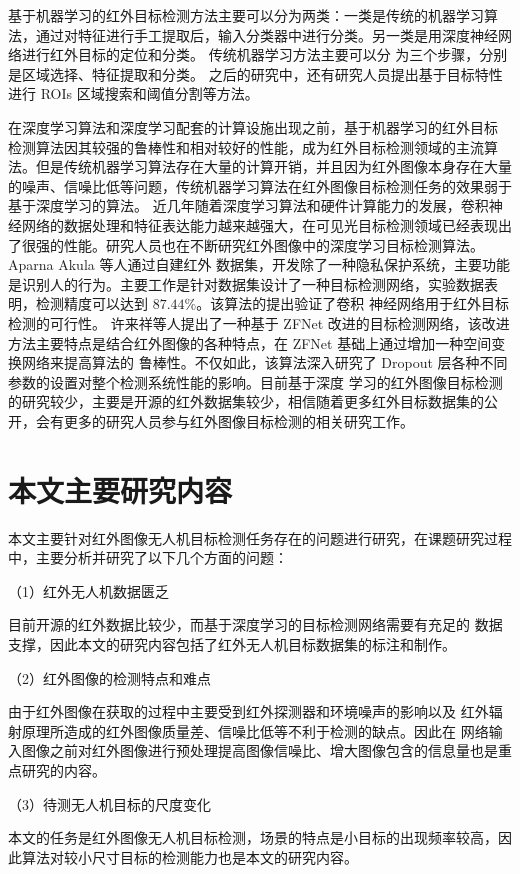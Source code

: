 基于机器学习的红外目标检测方法主要可以分为两类：一类是传统的机器学习算法，通过对特征进行手工提取后，输入分类器中进行分类。另一类是用深度神经网络进行红外目标的定位和分类。
传统机器学习方法主要可以分
为三个步骤，分别是区域选择、特征提取和分类。
之后的研究中，还有研究人员提出基于目标特性进行 ROIs
区域搜索和阈值分割等方法。

在深度学习算法和深度学习配套的计算设施出现之前，基于机器学习的红外目标
检测算法因其较强的鲁棒性和相对较好的性能，成为红外目标检测领域的主流算法。但是传统机器学习算法存在大量的计算开销，并且因为红外图像本身存在大量的噪声、信噪比低等问题，传统机器学习算法在红外图像目标检测任务的效果弱于基于深度学习的算法。
近几年随着深度学习算法和硬件计算能力的发展，卷积神经网络的数据处理和特征表达能力越来越强大，在可见光目标检测领域已经表现出了很强的性能。研究人员也在不断研究红外图像中的深度学习目标检测算法。
Aparna
Akula 等人通过自建红外
数据集，开发除了一种隐私保护系统，主要功能是识别人的行为。主要工作是针对数据集设计了一种目标检测网络，实验数据表明，检测精度可以达到 $87.44\%$。该算法的提出验证了卷积
神经网络用于红外目标检测的可行性\cite{akula2018deep}。
许来祥等人提出了一种基于 ZFNet 改进的目标检测网络，该改进方法主要特点是结合红外图像的各种特点，在 ZFNet 基础上通过增加一种空间变换网络来提高算法的
鲁棒性。不仅如此，该算法深入研究了 Dropout 层各种不同参数的设置对整个检测系统性能的影响\cite{许来祥2020基于改进}。目前基于深度
学习的红外图像目标检测的研究较少，主要是开源的红外数据集较少，相信随着更多红外目标数据集的公开，会有更多的研究人员参与红外图像目标检测的相关研究工作。

\section{本文主要研究内容}
本文主要针对红外图像无人机目标检测任务存在的问题进行研究，在课题研究过程中，主要分析并研究了以下几个方面的问题：

（1）红外无人机数据匮乏

目前开源的红外数据比较少，而基于深度学习的目标检测网络需要有充足的
数据支撑，因此本文的研究内容包括了红外无人机目标数据集的标注和制作。

（2）红外图像的检测特点和难点

由于红外图像在获取的过程中主要受到红外探测器和环境噪声的影响以及
红外辐射原理所造成的红外图像质量差、信噪比低等不利于检测的缺点。因此在
网络输入图像之前对红外图像进行预处理提高图像信噪比、增大图像包含的信息量也是重点研究的内容。

（3）待测无人机目标的尺度变化

本文的任务是红外图像无人机目标检测，场景的特点是小目标的出现频率较高，因此算法对较小尺寸目标的检测能力也是本文的研究内容。

